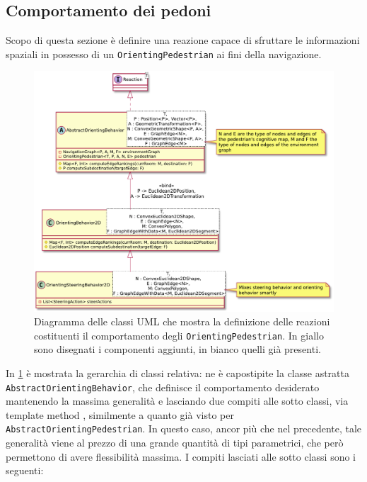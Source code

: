 \documentclass[12pt,a4paper,openright,oneside]{book}
\begin{document}
\subsection{Comportamento dei pedoni}
\label{design-orienting-behavior}
Scopo di questa sezione è definire una reazione capace di sfruttare le informazioni spaziali in possesso di un \texttt{OrientingPedestrian} ai fini della navigazione. 
\begin{figure}
	\centering
	\includegraphics[width=0.8\linewidth]{figures/orienting-behavior.pdf}
	\caption{Diagramma delle classi UML che mostra la definizione delle reazioni costituenti il comportamento degli \texttt{OrientingPedestrian}. In giallo sono disegnati i componenti aggiunti, in bianco quelli già presenti.}
	\label{fig:orienting-behavior}
\end{figure}
In \cref{fig:orienting-behavior} è mostrata la gerarchia di classi relativa: ne è capostipite la classe astratta \texttt{AbstractOrientingBehavior}, che definisce il comportamento desiderato mantenendo la massima generalità e lasciando due compiti alle sotto classi, via template method \cite{GoFDesignPatterns}, similmente a quanto già visto per \texttt{AbstractOrientingPedestrian}. In questo caso, ancor più che nel precedente, tale generalità viene al prezzo di una grande quantità di tipi parametrici, che però permettono di avere flessibilità massima. I compiti lasciati alle sotto classi sono i seguenti:
\end{document}
